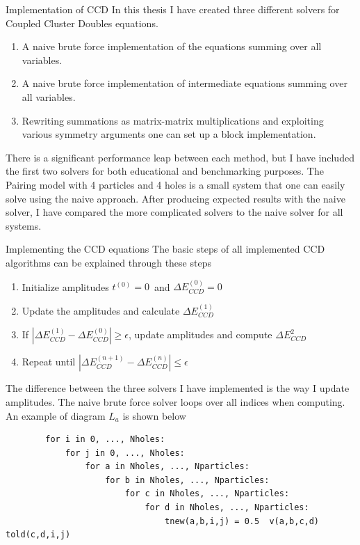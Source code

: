 \documentclass[twoside,english]{uiofysmaster}
\begin{document}
\begin{chapter}{Implementation of CCD}
	In this thesis I have created three different solvers for Coupled Cluster Doubles equations. 
	\begin{enumerate}
		\item A naive brute force implementation of the equations summing over all variables. 
		\item A naive brute force implementation of intermediate equations summing over all variables.
		\item Rewriting summations as matrix-matrix multiplications and exploiting various symmetry arguments one can set up a block implementation.
	\end{enumerate}	
	There is a significant performance leap between each method, but I have included the first two solvers for both educational and benchmarking purposes. The Pairing model with 4 particles and 4 holes is a small system that one can easily solve using the naive approach. After producing expected results with the naive solver, I have compared the more complicated solvers to the naive solver for all systems. 

	\begin{section}{Implementing the CCD equations}
		The basic steps of all implemented CCD algorithms can be explained through these steps
		\begin{enumerate}
			\item Initialize amplitudes $t^{(0)} = 0$ and $\Delta E_{CCD}^{(0)} = 0$
			\item Update the amplitudes and calculate $\Delta E_{CCD}^{(1)}$
			\item If $ |\Delta E_{CCD}^{(1)} - \Delta E_{CCD}^{(0)}| \geq \epsilon $, update amplitudes and compute $\Delta E_{CCD}^{2}$
			\item Repeat until $ |\Delta E_{CCD}^{(n+1)} - \Delta E_{CCD}^{(n)}| \leq \epsilon $
		\end{enumerate}
		The difference between the three solvers I have implemented is the way I update amplitudes. The naive brute force solver loops over all indices when computing. An example of diagram $L_a$ is shown below

		\begin{lstlisting}
		for i in 0, ..., Nholes:
			for j in 0, ..., Nholes:
				for a in Nholes, ..., Nparticles:
					for b in Nholes, ..., Nparticles:
						for c in Nholes, ..., Nparticles:
							for d in Nholes, ..., Nparticles:
								tnew(a,b,i,j) = 0.5  v(a,b,c,d)  told(c,d,i,j)
		\end{lstlisting}


\end{section}
\end{chapter}
\end{document}
